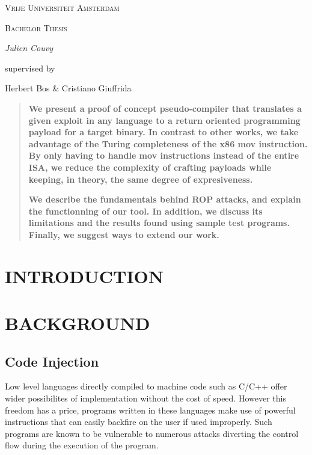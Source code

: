 \documentclass[10pt,twocolumn]{article}
\begin{document}
\begin{titlepage}
  \centering
  {\scshape\LARGE Vrije Universiteit Amsterdam\par}
  \vspace{1cm}
  {\scshape\Large Bachelor Thesis\par}
  \vspace{1.5cm}
  {\huge\bfseries <INSERT TITLE>\par}
  \vspace{2cm}
  {\Large\itshape Julien Couvy\par}
  \vfill
  supervised by\par
  Herbert Bos \& Cristiano Giuffrida
  \vfill
\end{titlepage}


\begin{abstract}

  \textbf{We present a proof of concept pseudo-compiler that translates a given
    exploit in any language to a return oriented programming payload for a
    target binary. In contrast to other works, we take advantage of the Turing
    completeness of the x86 mov instruction. By only having to handle mov
    instructions instead of the entire ISA, we reduce the complexity of crafting
  payloads while keeping, in theory, the same degree of expresiveness.}

  \textbf{We describe the fundamentals behind ROP attacks, and explain the
    functionning of our tool. In addition, we discuss its limitations and the
    results found using  sample test programs. Finally, we suggest ways to extend
  our work.}

\end{abstract}

\section{INTRODUCTION}
\lipsum[1-2]


\section{BACKGROUND}
\subsection{Code Injection}
Low level languages directly compiled to machine code such as C/C++ offer wider
possibilites of implementation without the cost of speed. However this freedom
has a price, programs written in these languages make use of powerful
instructions that can easily backfire on the user if used improperly. Such
programs are known to be vulnerable to numerous attacks diverting the control
flow during the execution of the program.
\end{document}
